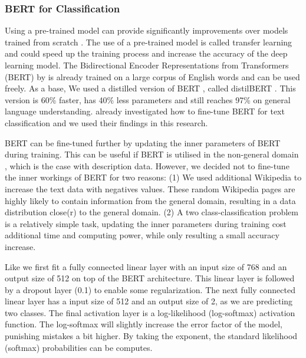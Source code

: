 \documentclass[a4paper, 12pt, oneside]{book} %
\begin{document}
\subsubsection{BERT for Classification}
Using a pre-trained model can provide significantly improvements over models trained from scratch \autocite{mikolov_distributed_2013}.
The use of a pre-trained model is called transfer learning and could speed up the training process and increase the accuracy of the deep learning model.
The Bidirectional Encoder Representations from Transformers (BERT) by \textcite{devlin_bert_2019} is already trained on a large corpus of English words and can be used freely.
As a base, We used a distilled version of BERT \autocite{devlin_bert_2019}, called distilBERT \autocite{sanh_distilbert_2020}. 
This version is 60\% faster, has 40\% less parameters and still reaches 97\% on general language understanding.
\textcite{sun_how_2020} already investigated how to fine-tune BERT for text classification and we used their findings in this research.

BERT can be fine-tuned further by updating the inner parameters of BERT during training. 
This can be useful if BERT is utilised in the non-general domain \autocite{devlin_bert_2019, sun_how_2020, sanh_distilbert_2020}, which is the case with description data.
However, we decided not to fine-tune the inner workings of BERT for two reasons: 
(1) We used additional Wikipedia to increase the text data with negatives values.
These random Wikipedia pages are highly likely to contain information from the general
domain, resulting in a  data distribution close(r) to the general domain.
(2) A two class-classification problem is a relatively simple task, updating the inner parameters during training cost additional time and computing power, while only resulting a small accuracy increase.

Like \textcite{sun_how_2020} we first fit a fully connected linear layer with an input size of 768 and an output size of 512 on top of the BERT architecture. 
This linear layer is followed by a dropout layer (0.1) to enable some regularization.
The next fully connected linear layer has a input size of 512 and an output size of 2, as we are predicting two classes.
The final activation layer is a log-likelihood (log-softmax) activation function.
The log-softmax will slightly increase the error factor of the model, punishing mistakes a bit higher.
By taking the exponent, the standard likelihood (softmax) probabilities can be computes.
\end{document}
